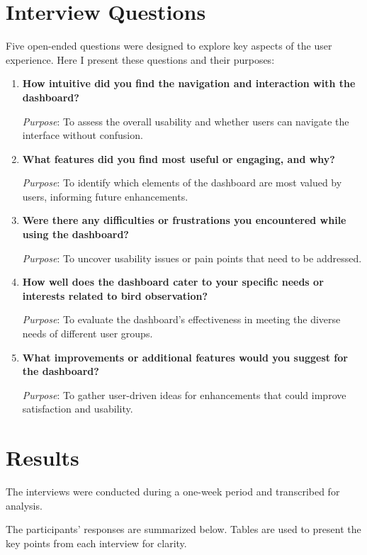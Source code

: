 \section{Interview Questions}

Five open-ended questions were designed to explore key aspects of the user experience. Here I present these questions and their purposes:

\begin{enumerate}
    \item \textbf{How intuitive did you find the navigation and interaction with the dashboard?}

    \textit{Purpose}: To assess the overall usability and whether users can navigate the interface without confusion.

    \item \textbf{What features did you find most useful or engaging, and why?}

    \textit{Purpose}: To identify which elements of the dashboard are most valued by users, informing future enhancements.

    \item \textbf{Were there any difficulties or frustrations you encountered while using the dashboard?}

    \textit{Purpose}: To uncover usability issues or pain points that need to be addressed.

    \item \textbf{How well does the dashboard cater to your specific needs or interests related to bird observation?}

    \textit{Purpose}: To evaluate the dashboard's effectiveness in meeting the diverse needs of different user groups.

    \item \textbf{What improvements or additional features would you suggest for the dashboard?}

    \textit{Purpose}: To gather user-driven ideas for enhancements that could improve satisfaction and usability.
\end{enumerate}

\section{Results}

The interviews were conducted during a one-week period and transcribed for analysis.

The participants' responses are summarized below. Tables are used to present the key points from each interview for clarity.

